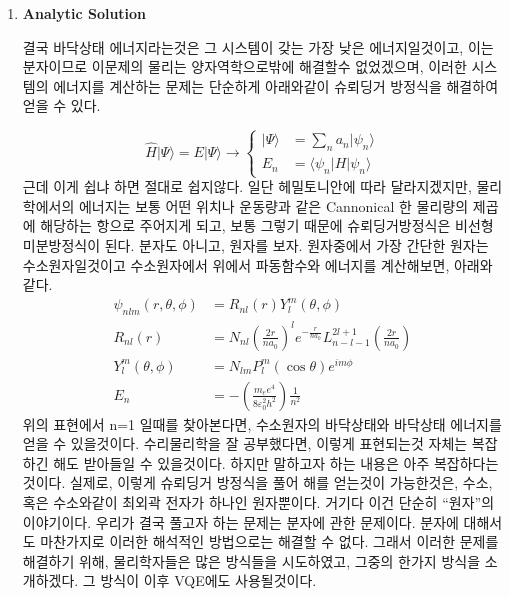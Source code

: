 \documentclass[11pt]{article}
\begin{document}
\begin{enumerate}[label=\arabic*)]
\item {\Large \textbf{Analytic Solution}}

결국 바닥상태 에너지라는것은 그 시스템이 갖는 가장 낮은 에너지일것이고, 이는 분자이므로 이문제의 물리는 양자역학으로밖에 해결할수 없었겠으며, 
이러한 시스템의 에너지를 계산하는 문제는 단순하게 아래와같이 슈뢰딩거 방정식을 해결하여 얻을 수 있다. 

\[
\hat{H}|\Psi\rangle = E|\Psi\rangle \longrightarrow
\left\{
\begin{aligned}
|\Psi\rangle &= \sum_n a_n |\psi_n \rangle \\
E_n &= \langle \psi_n | H | \psi_n \rangle
\end{aligned}
\right.
\]
근데 이게 쉽냐 하면 절대로 쉽지않다.  
일단 헤밀토니안에 따라 달라지겠지만, 물리학에서의 에너지는 보통 어떤 위치나 운동량과 같은 Cannonical 한 물리량의 제곱에 해당하는 항으로 주어지게 되고, 
보통 그렇기 때문에 슈뢰딩거방정식은 비선형 미분방정식이 된다. 
분자도 아니고, 원자를 보자. 원자중에서 가장 간단한 원자는 수소원자일것이고 
수소원자에서 위에서 파동함수와 에너지를 계산해보면, 아래와같다.
\begin{align*}
\psi_{nlm}(r, \theta, \phi) &= R_{nl}(r) Y_l^m(\theta, \phi) \\
R_{nl}(r) &= N_{nl} \left(\frac{2r}{na_0}\right)^l e^{-\frac{r}{na_0}} L_{n-l-1}^{2l+1}\left(\frac{2r}{na_0}\right) \\
Y_l^m(\theta, \phi) &= N_{lm} P_l^m(\cos \theta) e^{im\phi} \\
E_n &= -\left(\frac{m_e e^4}{8 \varepsilon_0^2 h^2}\right) \frac{1}{n^2}
\end{align*}
위의 표현에서 n=1 일때를 찾아본다면, 수소원자의 바닥상태와 바닥상태 에너지를 얻을 수 있을것이다. 
수리물리학을 잘 공부했다면, 이렇게 표현되는것 자체는 복잡하긴 해도 받아들일 수 있을것이다. 
하지만 말하고자 하는 내용은 아주 복잡하다는것이다. 
실제로, 이렇게 슈뢰딩거 방정식을 풀어 해를 얻는것이 가능한것은, 수소, 혹은 수소와같이 최외곽 전자가 하나인 원자뿐이다. 
거기다 이건 단순히 “원자”의 이야기이다. 우리가 결국 풀고자 하는 문제는 분자에 관한 문제이다. 분자에 대해서도 마찬가지로 이러한 해석적인 방법으로는 해결할 수 없다. 
그래서 이러한 문제를 해결하기 위해, 물리학자들은 많은 방식들을 시도하였고, 그중의 한가지 방식을 소개하겠다. 그 방식이 이후 VQE에도 사용될것이다. 
\end{enumerate}
\end{document}
